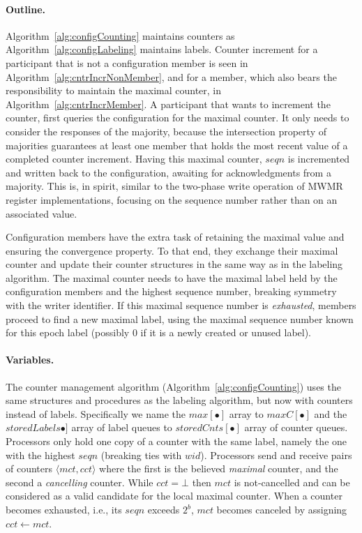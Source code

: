 \documentclass[11pt]{article}
\begin{document}
\paragraph{Outline.} 
Algorithm~\ref{alg:configCounting} maintains counters as Algorithm~\ref{alg:configLabeling} maintains labels. 
Counter increment for a participant that is not a configuration member is seen in Algorithm~\ref{alg:cntrIncrNonMember}, and for a member, which also bears the responsibility to maintain the maximal counter, in Algorithm~\ref{alg:cntrIncrMember}. A participant that wants to increment the counter, first queries the configuration for the maximal counter.
It only needs to consider the responses of the majority, because the intersection property of majorities guarantees at least one member that holds the most recent value of a completed counter increment.
Having this maximal counter, $seqn$ is incremented and written back to the configuration, awaiting for acknowledgments from a majority.
This is, in spirit, similar to the two-phase write operation of MWMR register implementations, focusing on the sequence number rather than on an associated value. 

Configuration members have the extra task of retaining the maximal value and ensuring the convergence property.
To that end, they exchange their maximal counter and update their counter structures in the same way as in the labeling algorithm. 
The maximal counter needs to have the maximal label held by the configuration members and the highest sequence number, breaking symmetry with the writer identifier. 
If this maximal sequence number is {\em exhausted}, members proceed to find a new maximal label, using the maximal sequence number known for this epoch label (possibly 0 if it is a newly created or unused label). 

\paragraph{Variables.} The counter management algorithm (Algorithm~\ref{alg:configCounting}) uses the same structures and procedures as the labeling algorithm, but now with counters instead of labels. 
Specifically we name the $max[\bullet]$ array to $maxC[\bullet]$ and the $storedLabels\bullet]$ array of label queues to $storedCnts[\bullet]$ array of counter queues.
Processors only hold one copy of a counter with the same label, namely the one with the highest $seqn$ (breaking ties with $wid$). 
Processors send and receive pairs of counters $\langle mct, cct \rangle$ where the first is the believed \emph{maximal} counter, and the second a \emph{cancelling} counter.
While $cct=\bot$ then $mct$ is not-cancelled and can be considered as a valid candidate for the local maximal counter.
When a counter becomes exhausted, i.e., its $seqn$ exceeds $2^{b}$, $mct$ becomes canceled by assigning $cct \gets mct$.
\end{document}

